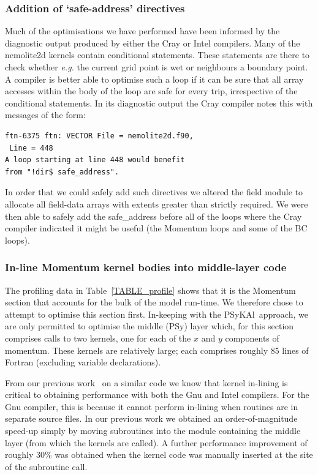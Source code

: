 \documentclass[journal]{IEEEtran}
\newcommand{\psykal}{{PS}y{KA}l\ }
\begin{document}
\subsubsection{Addition of `safe-address' directives}
\label{sec_safe_address}

Much of the optimisations we have performed have been informed by the
diagnostic output produced by either the Cray or Intel compilers. Many
of the nemolite2d kernels contain conditional statements. These
statements are there to check whether {\it e.g.} the current grid
point is wet or neighbours a boundary point. A compiler is better able
to optimise such a loop if it can be sure that all array accesses
within the body of the loop are safe for every trip, irrespective of
the conditional statements. In its diagnostic output the Cray compiler
notes this with messages of the form:
\begin{verbatim}
ftn-6375 ftn: VECTOR File = nemolite2d.f90,
 Line = 448 
A loop starting at line 448 would benefit 
from "!dir$ safe_address".
\end{verbatim}
In order that we could safely add such directives we altered the field
module to allocate all field-data arrays with extents greater than
strictly required.  We were then able to safely add the safe\_address
before all of the loops where the Cray compiler indicated it might be
useful (the Momentum loops and some of the BC loops).

\subsubsection{In-line Momentum kernel bodies into middle-layer code}
\label{sec_inline_mom}

The profiling data in Table~\ref{TABLE_profile} shows that it is the
Momentum section that accounts for the bulk of the model run-time.  We
therefore chose to attempt to optimise this section first. In-keeping
with the \psykal approach, we are only permitted to optimise the middle
(PSy) layer which, for this section comprises calls to two kernels,
one for each of the $x$ and $y$ components of momentum. These kernels
are relatively large; each comprises roughly 85 lines of Fortran
(excluding variable declarations).

From our previous work~\cite{shallow_psykal} on a similar code we know
that kernel in-lining is critical to obtaining performance with both
the Gnu and Intel compilers. For the Gnu compiler, this is because it
cannot perform in-lining when routines are in separate source
files. In our previous work we obtained an order-of-magnitude speed-up
simply by moving subroutines into the module containing the middle
layer (from which the kernels are called). A further performance
improvement of roughly 30\% was obtained when the kernel code was
manually inserted at the site of the subroutine call.
\end{document}
